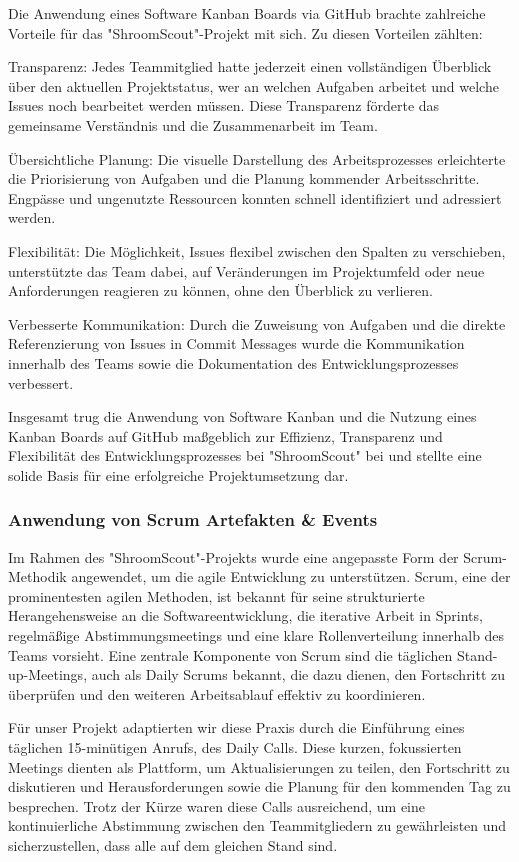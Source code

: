 \documentclass[../main.tex]{subfiles}
\begin{document}
Die Anwendung eines Software Kanban Boards via GitHub brachte zahlreiche Vorteile für das "ShroomScout"-Projekt mit sich. Zu diesen Vorteilen zählten:

Transparenz: Jedes Teammitglied hatte jederzeit einen vollständigen Überblick über den aktuellen Projektstatus, wer an welchen Aufgaben arbeitet und welche 
Issues noch bearbeitet werden müssen. Diese Transparenz förderte das gemeinsame Verständnis und die Zusammenarbeit im Team.

Übersichtliche Planung: Die visuelle Darstellung des Arbeitsprozesses erleichterte die Priorisierung von Aufgaben und die Planung kommender Arbeitsschritte. 
Engpässe und ungenutzte Ressourcen konnten schnell identifiziert und adressiert werden.

Flexibilität: Die Möglichkeit, Issues flexibel zwischen den Spalten zu verschieben, unterstützte das Team dabei, auf Veränderungen im Projektumfeld oder neue 
Anforderungen reagieren zu können, ohne den Überblick zu verlieren.

Verbesserte Kommunikation: Durch die Zuweisung von Aufgaben und die direkte Referenzierung von Issues in Commit Messages wurde die Kommunikation innerhalb 
des Teams sowie die Dokumentation des Entwicklungsprozesses verbessert.

Insgesamt trug die Anwendung von Software Kanban und die Nutzung eines Kanban Boards auf GitHub maßgeblich zur Effizienz, Transparenz und Flexibilität des 
Entwicklungsprozesses bei "ShroomScout" bei und stellte eine solide Basis für eine erfolgreiche Projektumsetzung dar.

\subsubsection{Anwendung von Scrum Artefakten \& Events}
Im Rahmen des "ShroomScout"-Projekts wurde eine angepasste Form der Scrum-Methodik angewendet, um die agile Entwicklung zu unterstützen. Scrum, eine der 
prominentesten agilen Methoden, ist bekannt für seine strukturierte Herangehensweise an die Softwareentwicklung, die iterative Arbeit in Sprints, regelmäßige 
Abstimmungsmeetings und eine klare Rollenverteilung innerhalb des Teams vorsieht. Eine zentrale Komponente von Scrum sind die täglichen Stand-up-Meetings, auch 
als Daily Scrums bekannt, die dazu dienen, den Fortschritt zu überprüfen und den weiteren Arbeitsablauf effektiv zu koordinieren.

Für unser Projekt adaptierten wir diese Praxis durch die Einführung eines täglichen 15-minütigen Anrufs, des Daily Calls. Diese kurzen, fokussierten Meetings 
dienten als Plattform, um Aktualisierungen zu teilen, den Fortschritt zu diskutieren und Herausforderungen sowie die Planung für den kommenden Tag zu besprechen. 
Trotz der Kürze waren diese Calls ausreichend, um eine kontinuierliche Abstimmung zwischen den Teammitgliedern zu gewährleisten und sicherzustellen, dass alle 
auf dem gleichen Stand sind.
\end{document}
